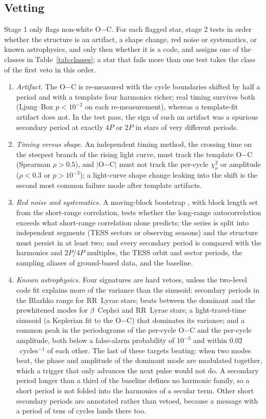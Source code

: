 \documentclass[final,5p]{elsarticle}
\newcommand{\oc}{O$-$C}
\newcommand{\bcep}{\ensuremath{\beta}~Cephei}
\begin{document}
\subsection{Vetting}
\label{sec:vetting}

Stage 1 only flags non-white \oc{}. For each flagged star, stage 2 tests in order whether the structure is an artifact, a shape change, red noise or systematics, or known astrophysics, and only then whether it is a code, and assigns one of the classes in Table~\ref{tab:classes}; a star that fails more than one test takes the class of the first veto in this order.

\begin{enumerate}
\item \emph{Artifact.} The \oc{} is re-measured with the cycle boundaries shifted by half a period and with a template four harmonics richer; real timing survives both (Ljung--Box $p<10^{-2}$ on each re-measurement), whereas a template-fit artifact does not. In the test pass, the sign of such an artifact was a spurious secondary period at exactly $4P$ or $2P$ in stars of very different periods.
\item \emph{Timing versus shape.} An independent timing method, the crossing time on the steepest branch of the rising light curve, must track the template \oc{} (Spearman $\rho>0.5$), and $|$\oc$|$ must not track the per-cycle $\chi^2_\nu$ or amplitude ($\rho<0.3$ or $p>10^{-3}$); a light-curve shape change leaking into the shift is the second most common failure mode after template artifacts.
\item \emph{Red noise and systematics.} A moving-block bootstrap \citep{Kunsch1989}, with block length set from the short-range correlation, tests whether the long-range autocorrelation exceeds what short-range correlation alone predicts; the series is split into independent segments (TESS sectors or observing seasons) and the structure must persist in at least two; and every secondary period is compared with the harmonics and $2P$/$4P$ multiples, the TESS orbit and sector periods, the sampling aliases of ground-based data, and the baseline.
\item \emph{Known astrophysics.} Four signatures are hard vetoes, unless the two-level code fit explains more of the variance than the sinusoid: secondary periods in the Blazhko range for RR~Lyrae stars; beats between the dominant and the prewhitened modes for \bcep{} and RR~Lyrae stars; a light-travel-time sinusoid (a Keplerian fit to the \oc{}) that dominates its variance; and a common peak in the periodograms of the per-cycle \oc{} and the per-cycle amplitude, both below a false-alarm probability of $10^{-3}$ and within $0.02$~cycles$^{-1}$ of each other. The last of these targets beating: when two modes beat, the phase and amplitude of the dominant mode are modulated together, which a trigger that only advances the next pulse would not do. A secondary period longer than a third of the baseline defines no harmonic family, so a short period is not folded into the harmonics of a secular term. Other short secondary periods are annotated rather than vetoed, because a message with a period of tens of cycles lands there too.

\end{enumerate}
\end{document}
